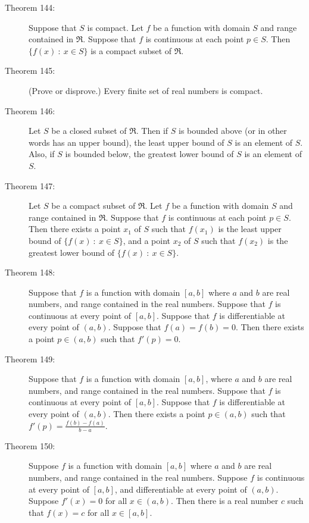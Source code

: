 \documentclass{article}
\begin{document}
\begin{description}
  \item[Theorem 144:] Suppose that $S$ is compact. Let $f$ be a function with domain $S$ and range contained in $\Re$. Suppose that $f$ is continuous at each point $p \in S$. Then $\{ f(x)\ :\ x \in S \}$ is a compact subset of $\Re$. 

  \item[Theorem 145:] (Prove or disprove.) Every finite set of real numbers is compact. 

  \item[Theorem 146:] Let $S$ be a closed subset of $\Re$. Then if $S$ is bounded above (or in other words has an upper bound), the least upper bound of $S$ is an element of $S$. Also, if $S$ is bounded below, the greatest lower bound of $S$ is an element of $S$. 

  \item[Theorem 147:] Let $S$ be a compact subset of $\Re$. Let $f$ be a function with domain $S$ and range contained in $\Re$. Suppose that $f$ is continuous at each point $p \in S$. Then there exists a point $x_{1}$ of $S$ such that $f(x_{1})$ is the least upper bound of $\{ f(x)\ :\ x \in S \}$, and a point $x_{2}$ of $S$ such that $f(x_{2})$ is the greatest lower bound of $\{ f(x)\ :\ x \in S \}$. 

  \item[Theorem 148:] Suppose that $f$ is a function with domain $[a,b]$ where $a$ and $b$ are real numbers, and range contained in the real numbers. Suppose that $f$ is continuous at every point of $[a,b]$. Suppose that $f$ is differentiable at every point of $(a,b)$. Suppose that $f(a) = f(b) = 0$. Then there exists a point $p \in (a,b)$ such that $f' (p) = 0$. 

  \item[Theorem 149:] Suppose that $f$ is a function with domain $[a,b]$, where $a$ and $b$ are real numbers, and range contained in the real numbers. Suppose that $f$ is continuous at every point of $[a,b]$. Suppose that $f$ is differentiable at every point of $(a,b)$. Then there exists a point $p \in (a,b)$ such that $f' (p) = \frac{f(b)-f(a)}{b-a}$.

  \item[Theorem 150:] Suppose $f$ is a function with domain $[a,b]$ where $a$ and $b$ are real numbers, and range contained in the real numbers. Suppose $f$ is continuous at every point of $[a,b]$, and differentiable at every point of $(a,b)$. Suppose $f' (x) = 0$ for all $x \in (a,b)$. Then there is a real number $c$ such that $f(x) = c$ for all $x \in [a,b]$.


\end{description}
\end{document}
